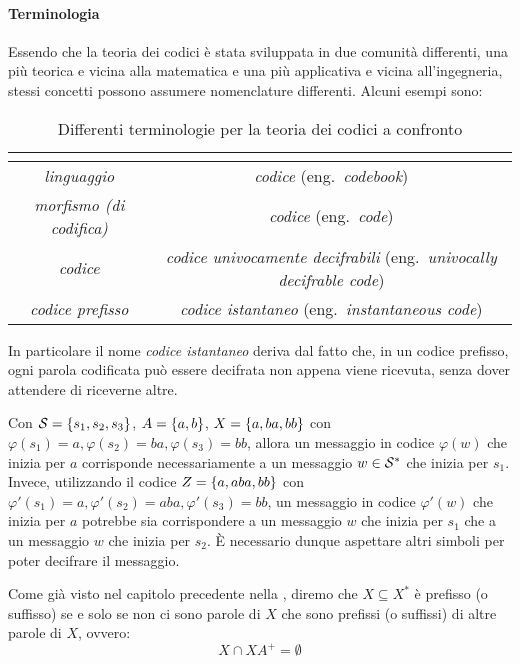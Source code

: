 \paragraph{Terminologia}
Essendo che la teoria dei codici è stata sviluppata in due comunità differenti, una più teorica e vicina alla matematica e una più applicativa e vicina all'ingegneria, stessi concetti possono assumere nomenclature differenti.
Alcuni esempi sono:
\begin{table}[h]
\centering
\begin{tabular}{|c|c|}
\hline
\textbf{\q{Matematica}} & \textbf{\q{Ingegneria}} \\
\hline
\emph{linguaggio} & \emph{codice} (eng.\ \emph{codebook}) \\
\emph{morfismo (di codifica)} & \emph{codice} (eng.\ \emph{code}) \\
\emph{codice} & \emph{codice univocamente decifrabili} (eng.\ \emph{univocally decifrable code}) \\
\emph{codice prefisso} & \emph{codice istantaneo} (eng.\ \emph{instantaneous code}) \\
\hline
\end{tabular}
\caption{Differenti terminologie per la teoria dei codici a confronto}\label{tab:code_theory_terms}
\end{table}

In particolare il nome \emph{codice istantaneo} deriva dal fatto che, in un codice prefisso, ogni parola codificata può essere decifrata non appena viene ricevuta, senza dover attendere di riceverne altre.

\begin{example}{}
  Con \(\SCal = \set{s_1,s_2,s_3}\), \(A = \set{a,b}\), \(X = \set{a,ba,bb}\) con \(\varphi(s_1) = a, \varphi(s_2) = ba, \varphi(s_3) = bb\), allora un messaggio in codice \(\varphi(w)\) che inizia per \(a\) corrisponde necessariamente a un messaggio \(w \in \mathcal{S}^*\) che inizia per \(s_1\).
  Invece, utilizzando il codice \(Z = \set{a,aba,bb}\) con \(\varphi'(s_1) = a, \varphi'(s_2) = aba, \varphi'(s_3) = bb\), un messaggio in codice \(\varphi'(w)\) che inizia per \(a\) potrebbe sia corrispondere a un messaggio \(w\) che inizia per \(s_1\) che a un messaggio \(w\) che inizia per \(s_2\).
  È necessario dunque aspettare altri simboli per poter decifrare il messaggio.
\end{example}

Come già visto nel capitolo precedente nella , diremo che \(X \subseteq X^*\) è prefisso (o suffisso) se e solo se non ci sono parole di \(X\) che sono prefissi (o suffissi) di altre parole di \(X\), ovvero:
\[X\cap XA^+ = \emptyset\]

